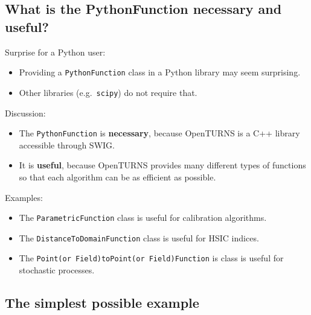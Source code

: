 \documentclass[11pt]{article}
\providecommand{\tightlist}{%
      \setlength{\itemsep}{0pt}\setlength{\parskip}{0pt}}
\begin{document}
    \hypertarget{what-is-the-pythonfunction-necessary-and-useful}{%
\subsection{What is the PythonFunction necessary and
useful?}\label{what-is-the-pythonfunction-necessary-and-useful}}

Surprise for a Python user:

\begin{itemize}
\tightlist
\item
  Providing a \texttt{PythonFunction} class in a Python library may seem
  surprising.
\item
  Other libraries (e.g.~\texttt{scipy}) do not require that.
\end{itemize}

Discussion:

\begin{itemize}
\tightlist
\item
  The \texttt{PythonFunction} is \textbf{necessary}, because OpenTURNS
  is a C++ library accessible through SWIG.
\item
  It is \textbf{useful}, because OpenTURNS provides many different types
  of functions so that each algorithm can be as efficient as possible.
\end{itemize}

Examples:

\begin{itemize}
\tightlist
\item
  The \texttt{ParametricFunction} class is useful for calibration
  algorithms.
\item
  The \texttt{DistanceToDomainFunction} class is useful for HSIC
  indices.
\item
  The \texttt{Point(or\ Field)toPoint(or\ Field)Function} is class is
  useful for stochastic processes.
\end{itemize}

    \hypertarget{the-simplest-possible-example}{%
\subsection{The simplest possible
example}\label{the-simplest-possible-example}}
\end{document}

